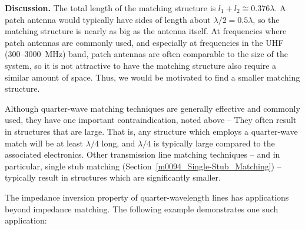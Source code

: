 \begin{example}
\begin{mdframed}[backgroundcolor=brown!20,linecolor=brown!20]

{\bf Discussion.}
The total length of the matching structure is $l_1+l_2 \cong 0.376\lambda$.
A patch antenna would typically have sides of length about $\lambda/2 = 0.5\lambda$, so the matching structure is nearly as big as the antenna itself.
At frequencies where patch antennas are commonly used, and especially at frequencies in the UHF (300--3000~MHz) band, patch antennas are often comparable to the size of the system, so it is not attractive to have the matching structure also require a similar amount of space.
Thus, we would be motivated to find a smaller matching structure.

\end{mdframed}\end{example}


Although quarter-wave matching techniques are generally effective and commonly used, they have one important contraindication, noted above --  They often result in structures that are large. That is, any structure which employs a quarter-wave match will be at least $\lambda/4$ long, and $\lambda/4$ is typically large compared to the associated electronics.  
Other transmission line matching techniques -- and in particular, single stub matching (Section~\ref{m0094_Single-Stub_Matching}) -- typically result in structures which are significantly smaller. 

The impedance inversion property of quarter-wavelength lines has applications beyond impedance matching.  
The following example demonstrates one such application:

